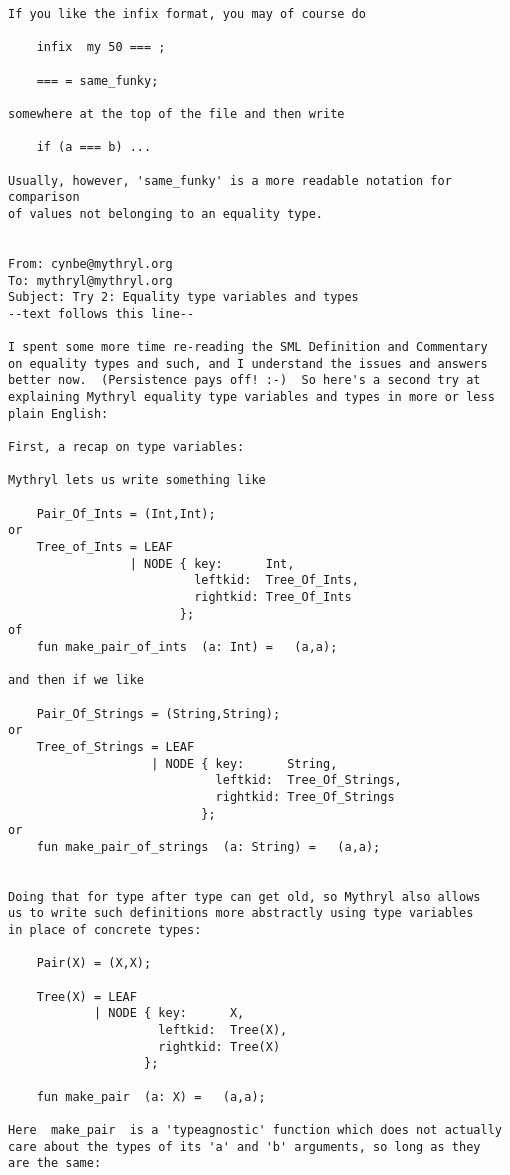 \begin{verbatim}
If you like the infix format, you may of course do 

    infix  my 50 === ; 

    === = same_funky; 

somewhere at the top of the file and then write  

    if (a === b) ... 

Usually, however, 'same_funky' is a more readable notation for comparison 
of values not belonging to an equality type. 


From: cynbe@mythryl.org 
To: mythryl@mythryl.org 
Subject: Try 2: Equality type variables and types 
--text follows this line-- 

I spent some more time re-reading the SML Definition and Commentary 
on equality types and such, and I understand the issues and answers 
better now.  (Persistence pays off! :-)  So here's a second try at 
explaining Mythryl equality type variables and types in more or less 
plain English: 

First, a recap on type variables: 

Mythryl lets us write something like 

    Pair_Of_Ints = (Int,Int); 
or 
    Tree_of_Ints = LEAF 
                 | NODE { key:      Int, 
                          leftkid:  Tree_Of_Ints, 
                          rightkid: Tree_Of_Ints 
                        }; 
of 
    fun make_pair_of_ints  (a: Int) =   (a,a); 

and then if we like 

    Pair_Of_Strings = (String,String); 
or 
    Tree_of_Strings = LEAF 
                    | NODE { key:      String, 
                             leftkid:  Tree_Of_Strings, 
                             rightkid: Tree_Of_Strings 
                           }; 
or 
    fun make_pair_of_strings  (a: String) =   (a,a); 


Doing that for type after type can get old, so Mythryl also allows 
us to write such definitions more abstractly using type variables 
in place of concrete types: 

    Pair(X) = (X,X); 

    Tree(X) = LEAF 
            | NODE { key:      X, 
                     leftkid:  Tree(X), 
                     rightkid: Tree(X) 
                   }; 

    fun make_pair  (a: X) =   (a,a); 

Here  make_pair  is a 'typeagnostic' function which does not actually 
care about the types of its 'a' and 'b' arguments, so long as they 
are the same: 


\end{verbatim}
